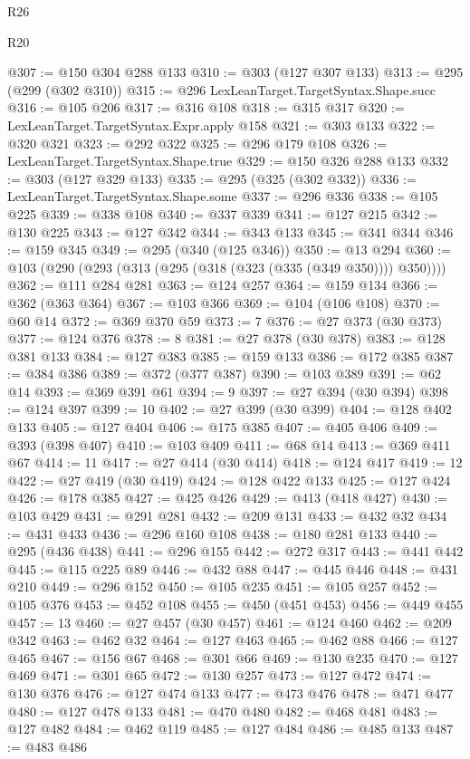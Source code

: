 \begin{lexlean}{R26}
\begin{lexlean}{R20}
\begin{coremodule}
{{{{{{{{{{{{{{{{{{{{{{{{{{{{{{{{{{{{{{{{{{{{{{{{{{{{{{{{{{{{{{{@307 := @150 @304 @288 @133
@310 := @303 (@127 @307 @133)
@313 := @295 (@299 (@302 @310))
@315 := @296 LexLeanTarget.TargetSyntax.Shape.succ
@316 := @105 @206
@317 := @316 @108
@318 := @315 @317
@320 := LexLeanTarget.TargetSyntax.Expr.apply @158
@321 := @303 @133
@322 := @320 @321
@323 := @292 @322
@325 := @296 @179 @108
@326 := LexLeanTarget.TargetSyntax.Shape.true
@329 := @150 @326 @288 @133
@332 := @303 (@127 @329 @133)
@335 := @295 (@325 (@302 @332))
@336 := LexLeanTarget.TargetSyntax.Shape.some
@337 := @296 @336
@338 := @105 @225
@339 := @338 @108
@340 := @337 @339
@341 := @127 @215
@342 := @130 @225
@343 := @127 @342
@344 := @343 @133
@345 := @341 @344
@346 := @159 @345
@349 := @295 (@340 (@125 @346))
@350 := @13 @294
@360 := @103 (@290 (@293 (@313 (@295 (@318 (@323 (@335 (@349 @350)))) @350))))
@362 := @111 @284 @281
@363 := @124 @257
@364 := @159 @134
@366 := @362 (@363 @364)
@367 := @103 @366
@369 := @104 (@106 @108)
@370 := @60 @14
@372 := @369 @370 @59
@373 := 7
@376 := @27 @373 (@30 @373)
@377 := @124 @376
@378 := 8
@381 := @27 @378 (@30 @378)
@383 := @128 @381 @133
@384 := @127 @383
@385 := @159 @133
@386 := @172 @385
@387 := @384 @386
@389 := @372 (@377 @387)
@390 := @103 @389
@391 := @62 @14
@393 := @369 @391 @61
@394 := 9
@397 := @27 @394 (@30 @394)
@398 := @124 @397
@399 := 10
@402 := @27 @399 (@30 @399)
@404 := @128 @402 @133
@405 := @127 @404
@406 := @175 @385
@407 := @405 @406
@409 := @393 (@398 @407)
@410 := @103 @409
@411 := @68 @14
@413 := @369 @411 @67
@414 := 11
@417 := @27 @414 (@30 @414)
@418 := @124 @417
@419 := 12
@422 := @27 @419 (@30 @419)
@424 := @128 @422 @133
@425 := @127 @424
@426 := @178 @385
@427 := @425 @426
@429 := @413 (@418 @427)
@430 := @103 @429
@431 := @291 @281
@432 := @209 @131
@433 := @432 @32
@434 := @431 @433
@436 := @296 @160 @108
@438 := @180 @281 @133
@440 := @295 (@436 @438)
@441 := @296 @155
@442 := @272 @317
@443 := @441 @442
@445 := @115 @225 @89
@446 := @432 @88
@447 := @445 @446
@448 := @431 @210
@449 := @296 @152
@450 := @105 @235
@451 := @105 @257
@452 := @105 @376
@453 := @452 @108
@455 := @450 (@451 @453)
@456 := @449 @455
@457 := 13
@460 := @27 @457 (@30 @457)
@461 := @124 @460
@462 := @209 @342
@463 := @462 @32
@464 := @127 @463
@465 := @462 @88
@466 := @127 @465
@467 := @156 @67
@468 := @301 @66
@469 := @130 @235
@470 := @127 @469
@471 := @301 @65
@472 := @130 @257
@473 := @127 @472
@474 := @130 @376
@476 := @127 @474 @133
@477 := @473 @476
@478 := @471 @477
@480 := @127 @478 @133
@481 := @470 @480
@482 := @468 @481
@483 := @127 @482
@484 := @462 @119
@485 := @127 @484
@486 := @485 @133
@487 := @483 @486
}}}}}}}}}}}}}}}}}}}}}}}}}}}}}}}}}}}}}}}}}}}}}}}}}}}}}}}}}}}}}}}
\end{coremodule}
\end{lexlean}
\end{lexlean}
